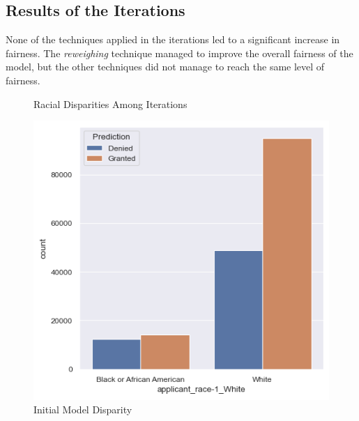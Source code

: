 \subsection{Results of the Iterations}\label{subsec:Iterations}

None of the techniques applied in the iterations led to a significant increase in fairness. The \textit{reweighing} technique managed to improve the overall fairness of the model, but the other techniques did not manage to reach the same level of fairness. 

\begin{figure}[h]
    \centering
    \caption{Racial Disparities Among Iterations}
    \begin{minipage}{0.5\textwidth}
        \centering
        \includegraphics[width=\textwidth]{images/loan_grants_by_protected_attributes/initial.png}
        \caption{Initial Model Disparity}
        \label{fig:Initial_Disparity}
    \end{minipage}\hfill
    \begin{minipage}{0.5\textwidth}
        \centering

\end{minipage}
\end{figure}
